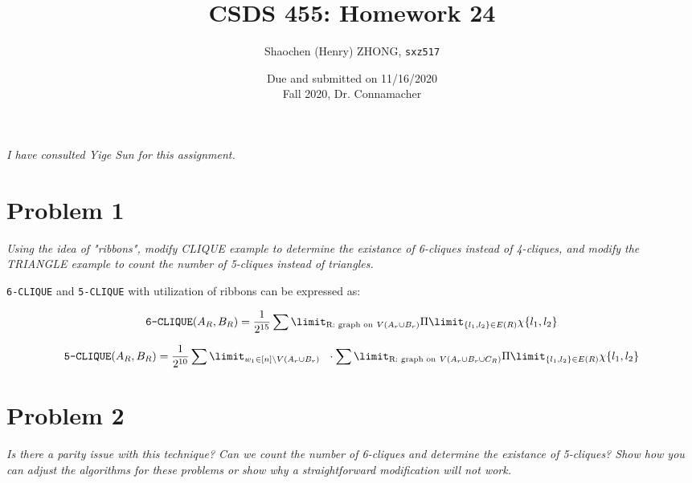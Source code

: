 \documentclass[11pt]{article}
\newcommand{\ilc}{\texttt}
\begin{document}
\title{\textbf{CSDS 455: Homework 24}}

\author{Shaochen (Henry) ZHONG, \ilc{sxz517}}
\date{Due and submitted on 11/16/2020 \\ Fall 2020, Dr. Connamacher}
\maketitle

\textit{I have consulted Yige Sun for this assignment.}\newline

\section*{Problem 1}

\textit{Using the idea of "ribbons", modify CLIQUE example to determine the existance of 6-cliques instead of 4-cliques, and modify the TRIANGLE example to count the number of 5-cliques instead of triangles.}\newline

\noindent \ilc{6-CLIQUE} and \ilc{5-CLIQUE} with utilization of ribbons can be expressed as:


\begin{equation*}
    \ilc{6-CLIQUE}(A_R, B_R) = \frac{1}{2^{15}} \sum\limit_{\text{R: graph on} \ V(A_r \cup B_r)} \Pi\limit_{\{l_1, l_2\} \in E(R)} \chi \{l_1, l_2\} \\
\end{equation*}




\begin{equation*}
    \ilc{5-CLIQUE}(A_R, B_R) = \frac{1}{2^{10}} \sum\limit_{w_1 \in [n] \char`\\ V(A_r \cup B_r)} \ \ \cdot \sum\limit_{\text{R: graph on} \ V(A_r \cup B_r \cup C_R)} \Pi\limit_{\{l_1, l_2\} \in E(R)} \chi \{l_1, l_2\}
\end{equation*}



\section*{Problem 2}
\textit{Is there a parity issue with this technique?  Can we count the number of 6-cliques and determine the existance of 5-cliques?  Show how you can adjust the algorithms for these problems or show why a straightforward modification will not work.}\newline
\end{document}
